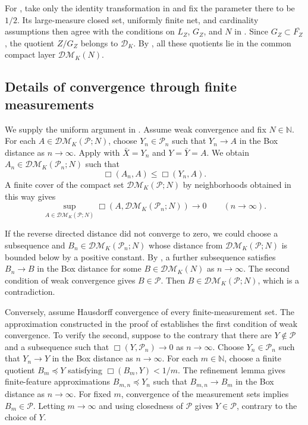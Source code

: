 \documentclass[10pt,a4paper]{amsart}
\newcommand{\DK}{\mathcal D_K}
\newcommand{\DM}{\mathcal{DM}}
\begin{document}
For , take only the identity transformation in \cite[Lemma~4.12]{gds2} and fix the parameter there to be $1/2$. Its large-measure closed set, uniformly finite net, and cardinality assumptions then agree with the conditions on $L_Z$, $G_Z$, and $N$ in . Since $G_Z\subset\overline{F_Z}$, the quotient $Z/G_Z$ belongs to $\DK$. By , all these quotients lie in the common compact layer $\DM_K(N)$.

\subsection{Details of convergence through finite measurements}
\label{subsec:app-pyramid-measurements}

We supply the uniform argument in . Assume weak convergence and fix $N\in\mathbb N$. For each $A\in\DM_K(\mathcal P;N)$, choose $Y_n\in\mathcal P_n$ such that $Y_n\to A$ in the Box distance as $n\to\infty$. Apply  with $\bar X=Y_n$ and $Y=\bar Y=A$. We obtain $A_n\in\DM_K(\mathcal P_n;N)$ such that
\[
\Box(A_n,A)\leq\Box(Y_n,A).
\]
A finite cover of the compact set $\DM_K(\mathcal P;N)$ by neighborhoods obtained in this way gives
\[
\sup_{A\in\DM_K(\mathcal P;N)}\Box(A,\DM_K(\mathcal P_n;N))\longrightarrow0\qquad(n\to\infty).
\]

If the reverse directed distance did not converge to zero, we could choose a subsequence and $B_n\in\DM_K(\mathcal P_n;N)$ whose distance from $\DM_K(\mathcal P;N)$ is bounded below by a positive constant. By , a further subsequence satisfies $B_n\to B$ in the Box distance for some $B\in\DM_K(N)$ as $n\to\infty$. The second condition of weak convergence gives $B\in\mathcal P$. Then $B\in\DM_K(\mathcal P;N)$, which is a contradiction.

Conversely, assume Hausdorff convergence of every finite-measurement set. The approximation constructed in the proof of  establishes the first condition of weak convergence. To verify the second, suppose to the contrary that there are $Y\notin\mathcal P$ and a subsequence such that $\Box(Y,\mathcal P_n)\to0$ as $n\to\infty$. Choose $Y_n\in\mathcal P_n$ such that $Y_n\to Y$ in the Box distance as $n\to\infty$. For each $m\in\mathbb N$, choose a finite quotient $B_m\preceq Y$ satisfying $\Box(B_m,Y)<1/m$. The refinement lemma gives finite-feature approximations $B_{m,n}\preceq Y_n$ such that $B_{m,n}\to B_m$ in the Box distance as $n\to\infty$. For fixed $m$, convergence of the measurement sets implies $B_m\in\mathcal P$. Letting $m\to\infty$ and using closedness of $\mathcal P$ gives $Y\in\mathcal P$, contrary to the choice of $Y$.
\end{document}
